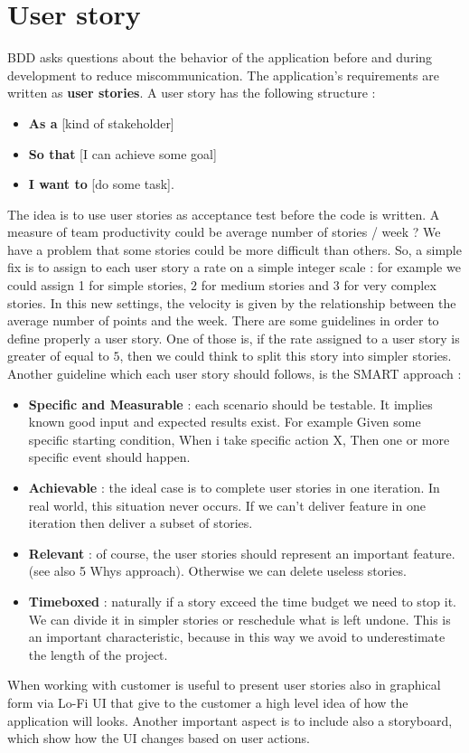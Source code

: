 \section{User story}
BDD asks questions about the behavior of the application before and during development to reduce miscommunication. The application's requirements are written as \textbf{user stories}. A user story has the following structure :
\begin{itemize}
    \item \textbf{As a} [kind of stakeholder]
    \item \textbf{So that} [I can achieve some goal]
    \item \textbf{I want to} [do some task].
\end{itemize}
The idea is to use user stories as acceptance test before the code is written. A measure of team productivity could be average number of stories / week ? We have a problem that some stories could be more difficult than others. So, a simple fix is to assign to each user story a rate on a simple integer scale : for example we could assign 1 for simple stories, $2$ for medium stories and $3$ for very complex stories. In this new settings, the velocity is given by the relationship between the average number of points and the week. There are some guidelines in order to define properly a user story. One of those is, if the rate assigned to a user story is greater of equal to $5$, then we could think to split this story into simpler stories. Another guideline which each user story should follows, is the SMART approach :
\begin{itemize}
    \item \textbf{Specific and Measurable} : each scenario should be testable. It implies known good input and expected results exist. For example Given some specific starting condition, When i take specific action X, Then one or more specific event should happen.
    \item \textbf{Achievable} : the ideal case is to complete user stories in one iteration. In real world, this situation never occurs. If we can't deliver feature in one iteration then deliver a subset of stories.
    \item \textbf{Relevant} : of course, the user stories should represent an important feature. (see also 5 Whys approach). Otherwise we can delete useless stories.
    \item \textbf{Timeboxed} : naturally if a story exceed the time budget we need to stop it. We can divide it in simpler stories or reschedule what is left undone. This is an important characteristic, because in this way we avoid to underestimate the length of the project.
\end{itemize}
When working with customer is useful to present user stories also in graphical form via Lo-Fi UI that give to the customer a high level idea of how the application will looks. Another important aspect is to include also a storyboard, which show how the UI changes based on user actions.
